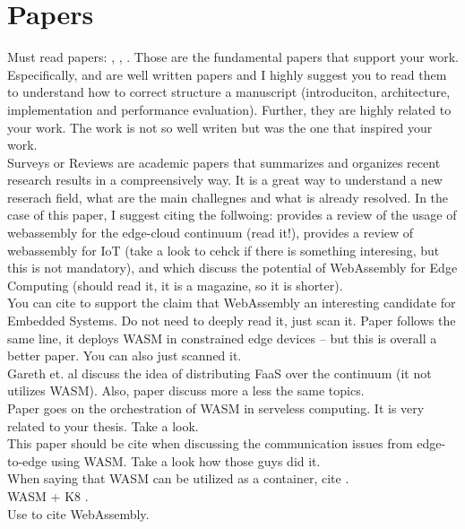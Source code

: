 \section{Papers}

Must read papers: \cite{wiprog}, \cite{Berardi2025ExtremeEdge}, \cite{dcoss}. 
Those are the fundamental papers that support your work. Especifically, \cite{wiprog} and \cite{Berardi2025ExtremeEdge} are well written papers and I highly suggest you to read them to understand how to correct structure a manuscript (introduciton, architecture, implementation and performance evaluation). Further, they are highly related to your work. The work \cite{dcoss} is not so well writen but was the one that inspired your work. \\


Surveys or Reviews are academic papers that summarizes and organizes recent research results in a compreensively way. It is a great way to understand a new reserach field, what are the main challegnes and what is already resolved. In the case of this paper, I suggest citing the follwoing: \cite{Sangeeta23} provides a review of the usage of webassembly for the edge-cloud continuum (read it!), \cite{Ray23} provides a review of webassembly for IoT (take a look to cehck if there is something interesing, but this is not mandatory), and \cite{Hoque2022} which discuss the potential of WebAssembly for Edge Computing (should read it, it is a magazine, so it is shorter). \\


You can cite \cite{Wallentowitz2022} to support the claim that WebAssembly an interesting candidate for Embedded Systems. Do not need to deeply read it, just scan it. Paper \cite{Borui22} follows the same line, it deploys WASM in constrained edge devices -- but this is overall a better paper. You can also just scanned it. \\

Gareth et. al \cite{Gareth2020} discuss the idea of distributing FaaS over the continuum (it not utilizes WASM). Also, paper \cite{Shihong23} discuss more a less the same topics. \\

Paper \cite{Kjorveziroski2023} goes on the orchestration of WASM in serveless computing. It is very related to your thesis. Take a look. \\

This paper \cite{Nakakaze24} should be cite when discussing the communication issues from edge-to-edge using WASM. Take a look how those guys did it. \\

When saying that WASM can be utilized as a container, cite \cite{10682874}. \\

WASM + K8 \cite{9978884}. \\

Use \cite{WASMSpec24} to cite WebAssembly. \\